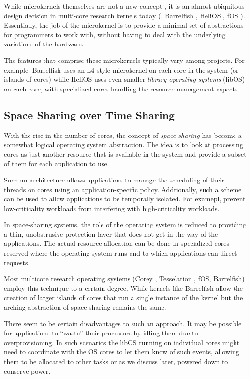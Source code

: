While microkernels themselves are not a new concept  \cite{Liedtke, Mach, Amoeba}, it is an almost ubiquitous design decision in multi-core research kernels today (\eg, Barrelfish \cite{barrelfish,Schupbach08embracingdiversity}, HeliOS \cite{Helios}, fOS \cite{fos}). Essentially, the job of the microkernel is to provide a minimal set of abstractions for programmers to work with, without having to deal with the underlying variations of the hardware.

The features that comprise these microkernels typically vary among projects. For example, Barrelfish uses an L4-style microkernel on each core in the system (or islands of cores) while HeliOS uses even smaller \emph{library operating systems} (libOS) on each core, with specialized cores handling the resource management aspects.

\subsection{Space Sharing over Time Sharing}

With the rise in the number of cores, the concept of \emph{space-sharing} has become a somewhat logical operating system abstraction. The idea is to look at processing cores as just another resource that is available in the system and provide a subset of them for each application to use.

Such an architecture allows applications to manage the scheduling of their threads on
cores using an application-specific policy. Addtionally, such a scheme can be used to allow applications to be temporally isolated. For examepl, prevent low-criticality workloads from interfering with high-criticality workloads.

In space-sharing systems, the role of the operating system is reduced to providing a thin, unobstrusive protection layer that does not get in the way of the applications. The actual resource allocation can be done in specialized cores reserved where the operating system runs and to which applications can direct requests.

Most multicore research operating systems (\eg Corey \cite{Corey}, Tesselation \cite{Tesselation}, fOS, Barrelfish) employ this technique to a certain degree. While kernels like Barrelfish allow the creation of larger islands of cores that run a single instance of the kernel but the arching abstraction of space-sharing remains the same.

There seem to be certain disadvantages to such an approach. It may be possible for applications to ``waste'' their processors by idling them due to overprovisioning. In such scenarios the libOS running on individual cores might need to coordinate with the OS cores to let them know of such events, allowing them to be allocated to other tasks or as we discuss later, powered down to conserve power.

